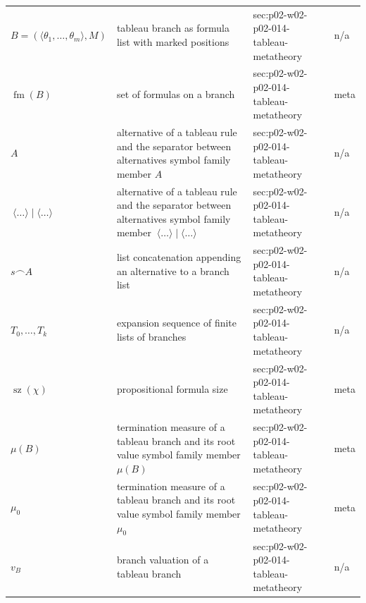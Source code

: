 \begin{longtable}{@{}p{}p{}p{}p{}@{}}
\(B=(\langle\theta_1,\allowbreak \ldots,\allowbreak \theta_m\rangle,\allowbreak M)\) & tableau branch as formula list with marked positions & sec:\allowbreak{}p02-\allowbreak{}w02-\allowbreak{}p02-\allowbreak{}014-\allowbreak{}tableau-\allowbreak{}metatheory & n/a \\
\(\operatorname{fm}(B)\) & set of formulas on a branch & sec:\allowbreak{}p02-\allowbreak{}w02-\allowbreak{}p02-\allowbreak{}014-\allowbreak{}tableau-\allowbreak{}metatheory & meta \\
\(A\) & alternative of a tableau rule and the separator between alternatives symbol family member \(A\) & sec:\allowbreak{}p02-\allowbreak{}w02-\allowbreak{}p02-\allowbreak{}014-\allowbreak{}tableau-\allowbreak{}metatheory & n/a \\
\(\ \langle\ldots\rangle\mid\langle\ldots\rangle\) & alternative of a tableau rule and the separator between alternatives symbol family member \(\ \langle\ldots\rangle\mid\langle\ldots\rangle\) & sec:\allowbreak{}p02-\allowbreak{}w02-\allowbreak{}p02-\allowbreak{}014-\allowbreak{}tableau-\allowbreak{}metatheory & n/a \\
\(s\frown A\) & list concatenation appending an alternative to a branch list & sec:\allowbreak{}p02-\allowbreak{}w02-\allowbreak{}p02-\allowbreak{}014-\allowbreak{}tableau-\allowbreak{}metatheory & n/a \\
\(T_0,\allowbreak \ldots,\allowbreak T_k\) & expansion sequence of finite lists of branches & sec:\allowbreak{}p02-\allowbreak{}w02-\allowbreak{}p02-\allowbreak{}014-\allowbreak{}tableau-\allowbreak{}metatheory & n/a \\
\(\operatorname{sz}(\chi)\) & propositional formula size & sec:\allowbreak{}p02-\allowbreak{}w02-\allowbreak{}p02-\allowbreak{}014-\allowbreak{}tableau-\allowbreak{}metatheory & meta \\
\(\mu(B)\) & termination measure of a tableau branch and its root value symbol family member \(\mu(B)\) & sec:\allowbreak{}p02-\allowbreak{}w02-\allowbreak{}p02-\allowbreak{}014-\allowbreak{}tableau-\allowbreak{}metatheory & meta \\
\(\mu_0\) & termination measure of a tableau branch and its root value symbol family member \(\mu_0\) & sec:\allowbreak{}p02-\allowbreak{}w02-\allowbreak{}p02-\allowbreak{}014-\allowbreak{}tableau-\allowbreak{}metatheory & meta \\
\(v_B\) & branch valuation of a tableau branch & sec:\allowbreak{}p02-\allowbreak{}w02-\allowbreak{}p02-\allowbreak{}014-\allowbreak{}tableau-\allowbreak{}metatheory & n/a \\

\end{longtable}
